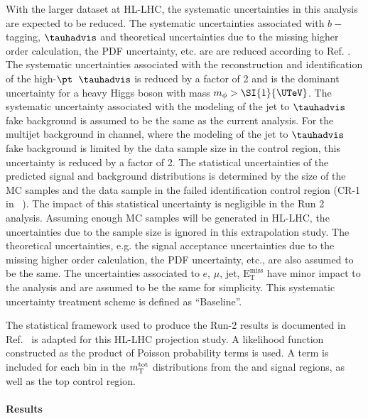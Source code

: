 With the larger dataset at HL-LHC, the systematic uncertainties in this analysis are expected to be reduced.
The systematic uncertainties associated with $b-$tagging, $\tauhadvis$ and theoretical uncertainties due to 
the missing higher order calculation, the PDF uncertainty, etc. are are reduced according to 
Ref. \cite{LHATLASdetectorSystScale}. The systematic uncertainties associated with the reconstruction 
and identification of the high-$\pt$~$\tauhadvis$ is reduced by a factor of 2 and is the dominant 
uncertainty for a heavy Higgs boson with mass $m_{\phi} >\SI{1}{\UTeV}$. The systematic uncertainty associated 
with the modeling of the jet to $\tauhadvis$ fake background is assumed to be the same as the current analysis.
For the multijet background in \hadhad channel, where the modeling of the jet to $\tauhadvis$ fake background 
is limited by the data sample size in the control region, this uncertainty is reduced by a factor of 2. 
The statistical uncertainties of the predicted signal and background distributions is determined 
by the size of the MC samples and the data sample in the failed \tauhadvis identification control region 
(CR-1 in ~\cite{ATLASRun2Ditau}). The impact of this statistical uncertainty is negligible in the Run 2 analysis. 
Assuming enough MC samples will be generated in HL-LHC, the uncertainties due to 
the sample size is ignored in this extrapolation study. The theoretical uncertainties, e.g. the signal acceptance 
uncertainties due to the missing higher order calculation, the PDF uncertainty, etc., are also assumed to be 
the same. The uncertainties associated to $e$, $\mu$, jet, $\mathrm{E^{miss}_T}$ have minor impact to the analysis 
and are assumed to be the same for simplicity. This systematic uncertainty treatment scheme is defined as ``Baseline''. 

The statistical framework used to produce the Run-2 results is documented in Ref.~\cite{ATLASRun2Ditau} is adapted 
for this HL-LHC projection study. A likelihood function constructed as the product of Poisson probability terms 
is used. A term is included for each bin in the $m_\textnormal{T}^\textnormal{tot}$ distributions from the \lephad and \hadhad signal regions, 
as well as the top control region. 

\paragraph{Results}
\label{sec:result}


